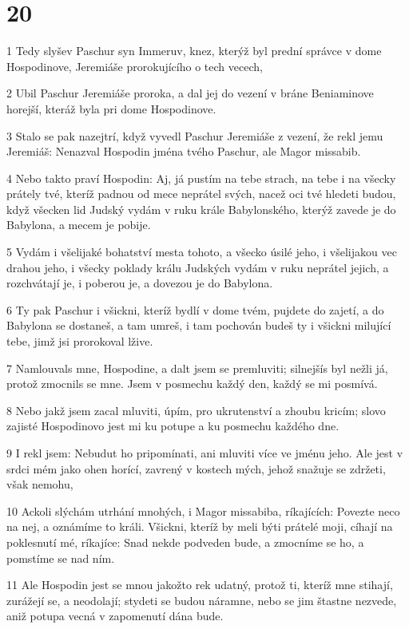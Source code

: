 \chapter{20}

\par 1 Tedy slyšev Paschur syn Immeruv, knez, kterýž byl prední správce v dome Hospodinove, Jeremiáše prorokujícího o tech vecech,
\par 2 Ubil Paschur Jeremiáše proroka, a dal jej do vezení v bráne Beniaminove horejší, kteráž byla pri dome Hospodinove.
\par 3 Stalo se pak nazejtrí, když vyvedl Paschur Jeremiáše z vezení, že rekl jemu Jeremiáš: Nenazval Hospodin jména tvého Paschur, ale Magor missabib.
\par 4 Nebo takto praví Hospodin: Aj, já pustím na tebe strach, na tebe i na všecky prátely tvé, kteríž padnou od mece neprátel svých, nacež oci tvé hledeti budou, když všecken lid Judský vydám v ruku krále Babylonského, kterýž zavede je do Babylona, a mecem je pobije.
\par 5 Vydám i všelijaké bohatství mesta tohoto, a všecko úsilé jeho, i všelijakou vec drahou jeho, i všecky poklady králu Judských vydám v ruku neprátel jejich, a rozchvátají je, i poberou je, a dovezou je do Babylona.
\par 6 Ty pak Paschur i všickni, kteríž bydlí v dome tvém, pujdete do zajetí, a do Babylona se dostaneš, a tam umreš, i tam pochován budeš ty i všickni milující tebe, jimž jsi prorokoval lžive.
\par 7 Namlouvals mne, Hospodine, a dalt jsem se premluviti; silnejšís byl nežli já, protož zmocnils se mne. Jsem v posmechu každý den, každý se mi posmívá.
\par 8 Nebo jakž jsem zacal mluviti, úpím, pro ukrutenství a zhoubu kricím; slovo zajisté Hospodinovo jest mi ku potupe a ku posmechu každého dne.
\par 9 I rekl jsem: Nebudut ho pripomínati, ani mluviti více ve jménu jeho. Ale jest v srdci mém jako ohen horící, zavrený v kostech mých, jehož snažuje se zdržeti, však nemohu,
\par 10 Ackoli slýchám utrhání mnohých, i Magor missabiba, ríkajících: Povezte neco na nej, a oznámíme to králi. Všickni, kteríž by meli býti prátelé moji, cíhají na poklesnutí mé, ríkajíce: Snad nekde podveden bude, a zmocníme se ho, a pomstíme se nad ním.
\par 11 Ale Hospodin jest se mnou jakožto rek udatný, protož ti, kteríž mne stihají, zurážejí se, a neodolají; stydeti se budou náramne, nebo se jim štastne nezvede, aniž potupa vecná v zapomenutí dána bude.

